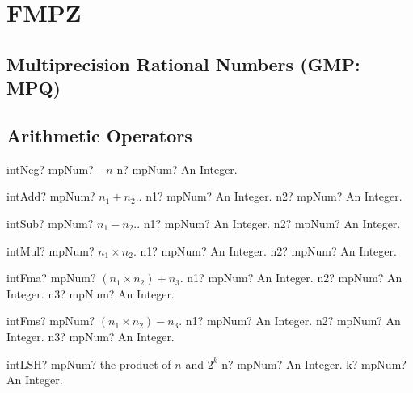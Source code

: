 \documentclass[12pt,a4paper,openany]{book}
\begin{document}
\chapter{FMPZ}

\section{Multiprecision Rational Numbers (GMP: MPQ)}

\section{Arithmetic Operators }

\begin{mpFunctionsExtract}
\mpFunctionOne
{intNeg? mpNum?  $-n$}
{n? mpNum? An Integer.}
\end{mpFunctionsExtract}

\begin{mpFunctionsExtract}
\mpFunctionTwo
{intAdd? mpNum?  $n_1 + n_2.$.}
{n1? mpNum? An Integer.}
{n2? mpNum? An Integer.}
\end{mpFunctionsExtract}

\begin{mpFunctionsExtract}
\mpFunctionTwo
{intSub? mpNum?  $n_1 - n_2.$.}
{n1? mpNum? An Integer.}
{n2? mpNum? An Integer.}
\end{mpFunctionsExtract}

\begin{mpFunctionsExtract}
\mpFunctionTwo
{intMul? mpNum?  $n_1  \times n_2$.}
{n1? mpNum? An Integer.}
{n2? mpNum? An Integer.}
\end{mpFunctionsExtract}

\begin{mpFunctionsExtract}
\mpFunctionThree
{intFma? mpNum? $(n_1 \times n_2) + n_3$.}
{n1? mpNum? An Integer.}
{n2? mpNum? An Integer.}
{n3? mpNum? An Integer.}
\end{mpFunctionsExtract}

\begin{mpFunctionsExtract}
\mpFunctionThree
{intFms? mpNum? $(n_1 \times n_2) - n_3$.}
{n1? mpNum? An Integer.}
{n2? mpNum? An Integer.}
{n3? mpNum? An Integer.}
\end{mpFunctionsExtract}

\begin{mpFunctionsExtract}
\mpFunctionTwo
{intLSH? mpNum? the product of $n$ and $2^k$}
{n? mpNum? An Integer.}
{k? mpNum? An Integer.}
\end{mpFunctionsExtract}
\end{document}
